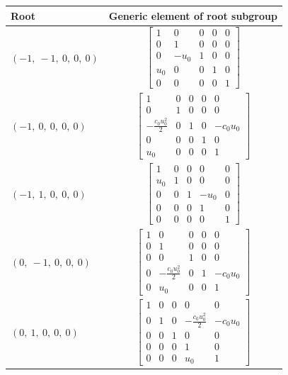 \documentclass[11pt]{article}
\theoremstyle{definition}
\begin{document}
\noindent \begin{longtable}{|l|c|}
    \hline
    \textbf{Root} & \textbf{Generic element of root subgroup} \\
    \hline
    \endhead
    $\left( -1, \  -1, \  0, \  0, \  0\right)$ & ${\left[\begin{matrix}1 & 0 & 0 & 0 & 0\\0 & 1 & 0 & 0 & 0\\0 & - u_{0} & 1 & 0 & 0\\u_{0} & 0 & 0 & 1 & 0\\0 & 0 & 0 & 0 & 1\end{matrix}\right]}$ \\
    \hline
    $\left( -1, \  0, \  0, \  0, \  0\right)$ & ${\left[\begin{matrix}1 & 0 & 0 & 0 & 0\\0 & 1 & 0 & 0 & 0\\- \frac{c_{0} u_{0}^{2}}{2} & 0 & 1 & 0 & - c_{0} u_{0}\\0 & 0 & 0 & 1 & 0\\u_{0} & 0 & 0 & 0 & 1\end{matrix}\right]}$ \\
    \hline
    $\left( -1, \  1, \  0, \  0, \  0\right)$ & ${\left[\begin{matrix}1 & 0 & 0 & 0 & 0\\u_{0} & 1 & 0 & 0 & 0\\0 & 0 & 1 & - u_{0} & 0\\0 & 0 & 0 & 1 & 0\\0 & 0 & 0 & 0 & 1\end{matrix}\right]}$ \\
    \hline
    $\left( 0, \  -1, \  0, \  0, \  0\right)$ & ${\left[\begin{matrix}1 & 0 & 0 & 0 & 0\\0 & 1 & 0 & 0 & 0\\0 & 0 & 1 & 0 & 0\\0 & - \frac{c_{0} u_{0}^{2}}{2} & 0 & 1 & - c_{0} u_{0}\\0 & u_{0} & 0 & 0 & 1\end{matrix}\right]}$ \\
    \hline
    $\left( 0, \  1, \  0, \  0, \  0\right)$ & ${\left[\begin{matrix}1 & 0 & 0 & 0 & 0\\0 & 1 & 0 & - \frac{c_{0} u_{0}^{2}}{2} & - c_{0} u_{0}\\0 & 0 & 1 & 0 & 0\\0 & 0 & 0 & 1 & 0\\0 & 0 & 0 & u_{0} & 1\end{matrix}\right]}$ \\

\end{longtable}
\end{document}
